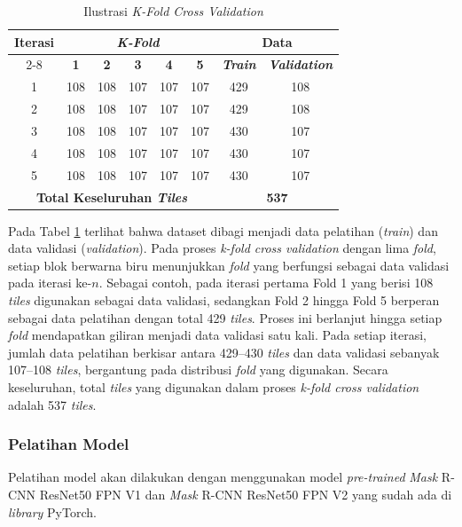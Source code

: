 \begin{table}[H]
\centering
\caption{Ilustrasi \textit{K-Fold Cross Validation}}
\label{table:4.pembagian_kfold}
\begin{tabular}{|c|c|c|c|c|c|c|c|}
\hline
\multirow{2}{*}{\textbf{Iterasi}} & \multicolumn{5}{c|}{\textbf{\textit{K-Fold}}} & \multicolumn{2}{c|}{\textbf{Data}} \\
\cline{2-8}
& \textbf{1} & \textbf{2} & \textbf{3} & \textbf{4} & \textbf{5} & \textbf{\textit{Train}} & \textbf{\textit{Validation}} \\
\hline
1 & \cellcolor{blue!20}108 & 108 & 107 & 107 & 107 & 429 & 108 \\
\hline
2 & 108 & \cellcolor{blue!20}108 & 107 & 107 & 107 & 429 & 108 \\
\hline
3 & 108 & 108 & \cellcolor{blue!20}107 & 107 & 107 & 430 & 107 \\
\hline
4 & 108 & 108 & 107 & \cellcolor{blue!20}107 & 107 & 430 & 107 \\
\hline
5 & 108 & 108 & 107 & 107 & \cellcolor{blue!20}107 & 430 & 107 \\
\hline
\multicolumn{6}{|c|}{\textbf{Total Keseluruhan \textit{Tiles}}} & \multicolumn{2}{c|}{\textbf{537}} \\
\hline
\end{tabular}

\end{table}
Pada Tabel \ref{table:4.pembagian_kfold} terlihat bahwa dataset dibagi menjadi data pelatihan (\textit{train}) dan data validasi (\textit{validation}). Pada proses \textit{k-fold cross validation} dengan lima \textit{fold}, setiap blok berwarna biru menunjukkan \textit{fold} yang berfungsi sebagai data validasi pada iterasi ke-$n$. Sebagai contoh, pada iterasi pertama Fold 1 yang berisi 108 \textit{tiles} digunakan sebagai data validasi, sedangkan Fold 2 hingga Fold 5 berperan sebagai data pelatihan dengan total 429 \textit{tiles}. Proses ini berlanjut hingga setiap \textit{fold} mendapatkan giliran menjadi data validasi satu kali. Pada setiap iterasi, jumlah data pelatihan berkisar antara 429--430 \textit{tiles} dan data validasi sebanyak 107--108 \textit{tiles}, bergantung pada distribusi \textit{fold} yang digunakan. Secara keseluruhan, total \textit{tiles} yang digunakan dalam proses \textit{k-fold cross validation} adalah 537 \textit{tiles}. \par

\subsubsection{Pelatihan Model}
Pelatihan model akan dilakukan dengan menggunakan model \textit{pre-trained} \textit{Mask} R-CNN ResNet50 FPN V1 dan \textit{Mask} R-CNN ResNet50 FPN V2 yang sudah ada di \textit{library} PyTorch. \par

